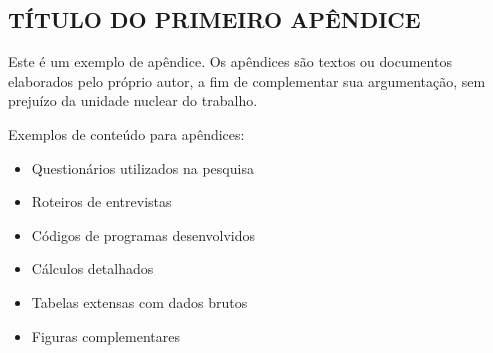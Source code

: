 
\postextual




\quebrapagina
\begin{apendicesenv}
    
    \section{TÍTULO DO PRIMEIRO APÊNDICE}
    \label{apendice:primeiro}
    
    Este é um exemplo de apêndice. Os apêndices são textos ou documentos elaborados pelo próprio autor, a fim de complementar sua argumentação, sem prejuízo da unidade nuclear do trabalho.
    
    Exemplos de conteúdo para apêndices:
    \begin{itemize}
        \item Questionários utilizados na pesquisa
        \item Roteiros de entrevistas
        \item Códigos de programas desenvolvidos
        \item Cálculos detalhados
        \item Tabelas extensas com dados brutos
        \item Figuras complementares
    \end{itemize}
    
\end{apendicesenv}